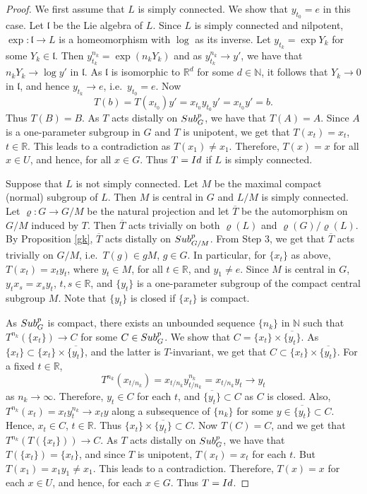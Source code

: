 \documentclass[10pt,a4paper]{amsart}
\let\ol=\overline
\newcommand{\Id}{{\rm Id}}
\newcommand{\N}{{\mathbb N}}
\newcommand{\R}{{\mathbb R}}
\newcommand{\lf}{{\mathfrak l}}
\newcommand{\spg}{{\rm Sub}^p_G}
\newcommand{\spp}{{\rm Sub}^{p}}
\begin{document}
\begin{proof}
 \smallskip
  We first assume that $L$ is simply connected. We show that $y_{t_0}=e$ in this case.
Let $\lf$ be the Lie algebra of $L$. Since $L$ is simply connected and nilpotent, $\exp: \lf\to L$ is a 
homeomorphism with $\log$ as its inverse. Let $y_{t_k}=\exp Y_k$ for some $Y_k\in\lf$. 
Then $y_{t_k}^{n_k}=\exp(n_kY_k)$ and as $y_{t_k}^{n_k}\to y'$, we have 
that $n_kY_k\to \log y'$ in $\lf$. As $\lf$ is isomorphic to $\R^d$ for some $d\in\N$, it follows that $Y_k\to 0$ in $\lf$, 
and hence $y_{t_k}\to e$, i.e.\ $y_{t_0}=e$. Now
$$
T(b)=T(x_{t_0})y'=x_{t_0}y_{t_0}y'=x_{t_0}y'=b.$$
Thus $T(B)=B$. As $T$ acts distally on $\spg$, we have that $T(A)=A$. Since $A$ is a one-parameter subgroup in $G$ 
and $T$ is unipotent, we get that $T(x_t)=x_t$, $t\in\R$. This leads to a contradiction as $T(x_1)\ne x_1$. 
Therefore, $T(x)=x$ for all $x\in U$, and hence, for all $x\in G$. Thus $T=\Id$ if $L$ is simply connected. 
 
 \smallskip
  Suppose that $L$ is not simply connected. Let $M$ be the maximal 
 compact (normal) subgroup of $L$. Then $M$ is central in $G$ and $L/M$ is simply connected. 
 Let $\varrho:G\to G/M$ be the natural projection and let $\ol{T}$ be the automorphism on $G/M$ 
 induced by $T$. Then $\ol{T}$ acts trivially on both $\varrho(L)$ and $\varrho(G)/\varrho(L)$. 
 By Proposition \ref{gk}, $\ol{T}$ acts distally on $\spp_{G/M}$. From Step 3, we get that $\ol{T}$ acts trivially on 
 $G/M$, i.e.\ $T(g)\in gM$, $g\in G$. In particular, for $\{x_t\}$ as above, $T(x_t)=x_ty_t$, where $y_t\in M$, 
 for all $t\in\R$, and $y_1\ne e$. Since $M$ is central in $G$, $y_tx_s=x_sy_t$, $t, s\in \R$, and $\{y_t\}$ is a 
 one-parameter subgroup of the compact central subgroup $M$. Note that $\{y_t\}$ is closed if $\{x_t\}$ is compact. 

As $\spg$ is compact, there exists an unbounded sequence $\{n_k\}$ in $\N$ such that $T^{n_k}(\{x_t\})\to C$ 
for some $C\in\spg$. We show that $C=\{x_t\}\times \ol{\{y_t\}}$. As $\{x_t\}\subset \{x_t\}\times \ol{\{y_t\}}$, 
and the latter is $T$-invariant, we get that $C\subset \{x_t\}\times \ol{\{y_t\}}$. For a fixed $t\in\R$, 
$$
T^{n_k}(x_{t/n_k})=x_{t/n_k}y_{t/n_k}^{n_k}=x_{t/n_k}y_t\to y_t$$ 
as $n_k\to\infty$. Therefore, $y_t\in C$ for each $t$, and $\ol{\{y_t\}}\subset C$ as $C$ is closed. Also, 
$T^{n_k}(x_t)=x_ty_t^{n_k}\to x_ty$ along a subsequence of $\{n_k\}$ for some $y\in\ol{\{y_t\}}\subset C$.
Hence, $x_t\in C$, $t\in\R$. Thus $\{x_t\}\times \ol{\{y_t\}}\subset C$. 
Now $T(C)=C$, and we get that $T^{n_k}(T(\{x_t\}))\to C$. As $T$ acts distally on $\spg$, we have that 
$T(\{x_t\})=\{x_t\}$, and since $T$ is unipotent, $T(x_t)=x_t$ for each $t$. 
But $T(x_1)=x_1y_1\ne x_1$.  
This leads to a contradiction. Therefore, $T(x)=x$ for each $x\in U$, and hence, for each $x\in G$. 
Thus $T=\Id$.
 \end{proof}
\end{document}
